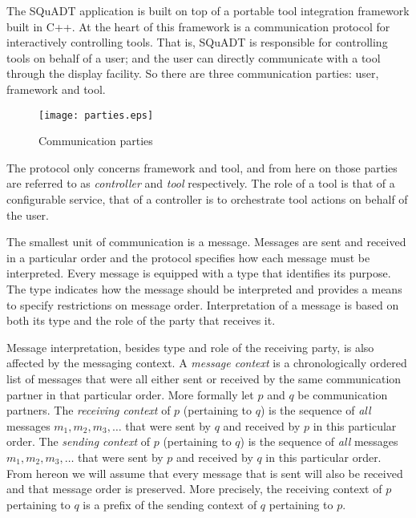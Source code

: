 \documentclass{article}
\newcommand{\squadt}{SQuADT\xspace}
\begin{document}
  The \squadt application is built on top of a portable tool integration
  framework built in C++. At the heart of this framework is a communication
  protocol for interactively controlling tools. That is, \squadt is responsible
  for controlling tools on behalf of a user; and the user can directly
  communicate with a tool through the display facility. So there are three
  communication parties: user, framework and tool.

  \begin{figure}[H]
   \begin{center}
    \texttt{[image: parties.eps]}
   \end{center}
   \vspace{-0.3cm}
   \caption{Communication parties}
  \end{figure}
  
  The protocol only concerns framework and tool, and from here on those parties
  are referred to as \textit{controller} and \textit{tool} respectively.  The
  role of a tool is that of a configurable service, that of a controller is to
  orchestrate tool actions on behalf of the user.

  The smallest unit of communication is a message. Messages are sent and
  received in a particular order and the protocol specifies how each message
  must be interpreted. Every message is equipped with a type that identifies
  its purpose.  The type indicates how the message should be interpreted and
  provides a means to specify restrictions on message order. Interpretation of
  a message is based on both its type and the role of the party that receives
  it.

  Message interpretation, besides type and role of the receiving party, is also
  affected by the messaging context.  A \textit{message context} is a
  chronologically ordered list of messages that were all either sent or
  received by the same communication partner in that particular order.  More
  formally let $p$ and $q$ be communication partners. The \textit{receiving
  context} of $p$ (pertaining to $q$) is the sequence of \emph{all} messages
  $m_{1}, m_{2}, m_{3}, \ldots$ that were sent by $q$ and received by $p$ in
  this particular order.  The \textit{sending context} of $p$ (pertaining to
  $q$) is the sequence of \emph{all} messages $m_{1}, m_{2}, m_{3}, \ldots$
  that were sent by $p$ and received by $q$ in this particular order. From
  hereon we will assume that every message that is sent will also be received
  and that message order is preserved. More precisely, the receiving context of
  $p$ pertaining to $q$ is a prefix of the sending context of $q$ pertaining to
  $p$.
\end{document}
